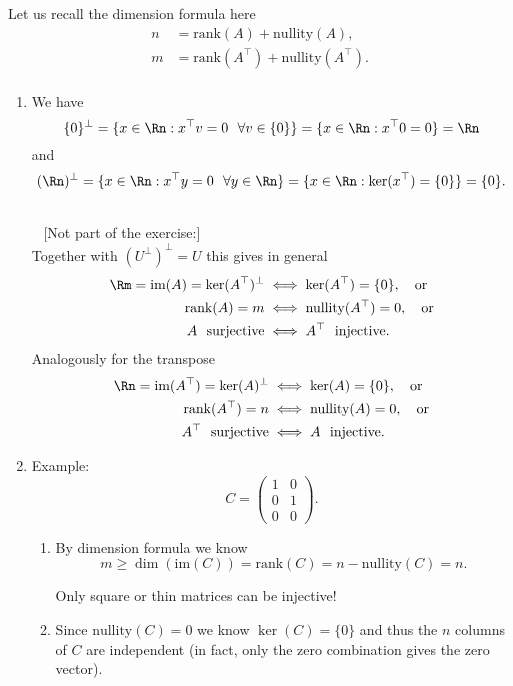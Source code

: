 {\color{solution}
Let us recall the dimension formula here
\begin{align*}
n &= \text{rank}(A) + \text{nullity}(A),\\
m &= \text{rank}(A^\top) + \text{nullity}(A^\top).\\
\end{align*}
\begin{enumerate}
	\item
	We have
	$$\{0\}^\bot = \{x \in \Rn: x^\top v = 0~~ \forall v \in \{0\}\} = \{x \in \Rn: x^\top 0 = 0 \} = \Rn  $$
	and
	$$(\Rn)^\bot = \{x \in \Rn: x^\top y = 0~~ \forall y \in \Rn\}= \{x \in \Rn:  \ker(x^\top) = \{0\}\} = \{0\}.  $$


~\\~
[Not part of the exercise:]~\\ Together with $(U^\bot)^\bot=U$ this gives in general
\begin{align*}
\Rm = \text{im}(A) =\ker(A^\top)^\bot &\iff  \ker(A^\top) = \{0\},~~~\text{or}\\
\text{rank}(A) = m &\iff  \text{nullity}(A^\top) = 0,~~~\text{or}  \\
A ~~\text{surjective} &\iff A^\top ~~ \text{injective}.
\end{align*}
Analogously for the transpose
\begin{align*}
 \Rn = \text{im}(A^\top) =\ker(A)^\bot &\iff  \ker(A) = \{0\},~~~\text{or}\\
 \text{rank}(A^\top) = n &\iff  \text{nullity}(A) = 0,~~~\text{or}  \\
 A^\top ~~\text{surjective} &\iff A ~~ \text{injective}.
\end{align*}
	\item 
	Example: $$ C = \begin{pmatrix}1&0\\0&1\\0&0\end{pmatrix}.$$
	\begin{enumerate}
		\item 		By dimension formula we know $$m \geq \dim(\text{im}(C))=\text{rank}(C) = n - \text{nullity}(C) = n. $$
		\begin{center}
			 Only square or thin matrices can be injective!
		\end{center}
		\item 		Since  $\text{nullity}(C)=0$ we know $\ker(C) = \{0\}$ and thus the $n$ columns of $C$ are independent (in fact, only the zero combination gives the zero vector).		

\end{enumerate}
\end{enumerate}}
